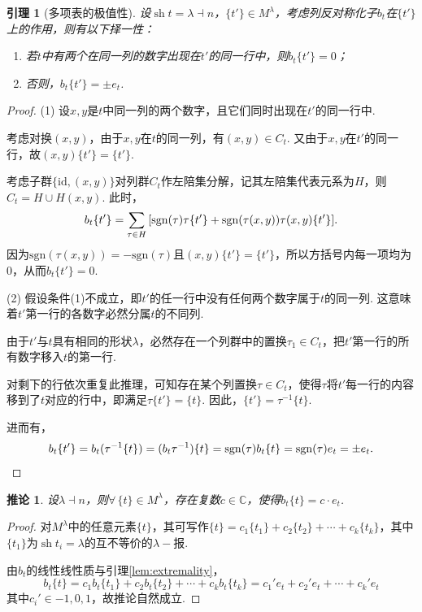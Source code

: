 \documentclass{sjtureport}
\newtheorem{lemma}[theorem]{引理}
\newtheorem{corollary}[theorem]{推论}
\DeclareMathOperator{\sh}{sh}
\begin{document}
\begin{lemma}[多项表的极值性]{\label{lem:extremality}}
    设$\sh t=\lambda\dashv n$，$\{t'\}\in M^\lambda$，考虑列反对称化子$b_t$在$\{t'\}$上的作用，则有以下择一性：
    \begin{enumerate}
        \item 若$t$中有两个在同一列的数字出现在$t'$的同一行中，则$b_t\{t'\} = 0$；
        \item 否则，$b_t\{t'\} =\pm e_t$.
    \end{enumerate}
\end{lemma}
\begin{proof}
    (1) 设$x,y$是$t$中同一列的两个数字，且它们同时出现在$t'$的同一行中.\par
    考虑对换$(x,y)$，由于$x,y$在$t$的同一列，有$(x,y) \in C_t$. 又由于$x,y$在$t'$的同一行，故$(x,y)\{t'\} = \{t'\}$. \par
    考虑子群$\{\mathrm{id}, (x,y)\}$对列群$C_t$作左陪集分解，记其左陪集代表元系为$H$，则$C_t = H \cup H(x,y)$. 此时，
    \begin{equation*}
        b_t\{t'\} = \sum_{\tau \in H} \qty[ \mathrm{sgn}(\tau)\tau \{t'\} + \mathrm{sgn}(\tau(x,y))\tau(x,y) \{t'\} ].
    \end{equation*}
    因为$\mathrm{sgn}(\tau(x,y)) = -\mathrm{sgn}(\tau)$且$(x,y)\{t'\}=\{t'\}$，所以方括号内每一项均为0，从而$b_t\{t'\} = 0$.
    
    (2) 假设条件(1)不成立，即$t'$的任一行中没有任何两个数字属于$t$的同一列. 这意味着$t'$第一行的各数字必然分属$t$的不同列.\par
    由于$t'$与$t$具有相同的形状$\lambda$，必然存在一个列群中的置换$\tau_1 \in C_t$，把$t'$第一行的所有数字移入$t$的第一行.\par
    对剩下的行依次重复此推理，可知存在某个列置换$\tau \in C_t$，使得$\tau$将$t'$每一行的内容移到了$t$对应的行中，即满足$\tau\{t'\} = \{t\}$.
    因此，$\{t'\} = \tau^{-1}\{t\}$.\par
    进而有，
    \begin{equation*}
        b_t\{t'\} = b_t (\tau^{-1}\{t\}) = (b_t\tau^{-1})\{t\} = \mathrm{sgn}(\tau)b_t\{t\} = \mathrm{sgn}(\tau)e_t = \pm e_t. \qedhere
    \end{equation*}
\end{proof}

\begin{corollary}{\label{cor:extremality}}
    设$\lambda\dashv n$，则$\forall\, \{t\}\in M^\lambda$，存在复数$c\in \mathbb{C}$，使得$b_t\{t\}=c \cdot e_t$.
\end{corollary}
\begin{proof}
    对$M^\lambda$中的任意元素$\{t\}$，其可写作$\{t\}=c_1\{t_1\} + c_2\{t_2\} + \cdots + c_k\{t_k\}$，其中$\{t_1\}$为$\sh t_i=\lambda$的互不等价的$\lambda-\!$报.\par
    由$b_t$的线性线性质与引理\ref{lem:extremality}，
    \begin{equation*}
        b_t\{t\} = c_1 b_t\{t_1\} + c_2 b_t\{t_2\} + \cdots + c_k b_t\{t_k\}=c_1' e_t + c_2' e_t + \cdots + c_k' e_t 
    \end{equation*}
    其中$c_i'\in {-1,0,1}$，故推论自然成立.
\end{proof}
\end{document}
